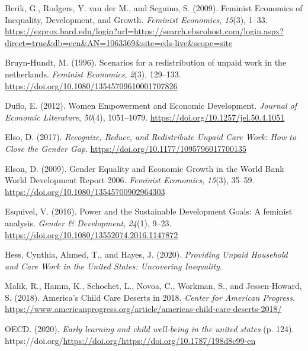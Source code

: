 \documentclass[
  11pt,
]{article}
\newlength{\cslhangindent}
\newenvironment{CSLReferences}[2] %
 {\begin{list}{}{%
  \setlength{\itemindent}{0pt}
  \setlength{\leftmargin}{0pt}
  \setlength{\parsep}{0pt}
  \ifodd #1
   \setlength{\leftmargin}{\cslhangindent}
   \setlength{\itemindent}{-1\cslhangindent}
  \fi
  \setlength{\itemsep}{#2\baselineskip}}}
 {\end{list}}
\begin{document}
\label{refs}
\begin{CSLReferences}{1}{0}
Berik, G., Rodgers, Y. van der M., and Seguino, S. (2009). Feminist
{Economics} of {Inequality}, {Development}, and {Growth}. \emph{Feminist
Economics}, \emph{15}(3), 1--33.
\url{https://ezprox.bard.edu/login?url=https://search.ebscohost.com/login.aspx?direct=true&db=ecn&AN=1063369&site=eds-live&scope=site}

Bruyn-Hundt, M. (1996). Scenarios for a redistribution of unpaid work in
the netherlands. \emph{Feminist Economics}, \emph{2}(3), 129--133.
\url{https://doi.org/10.1080/13545709610001707826}

Duflo, E. (2012). Women {Empowerment} and {Economic} {Development}.
\emph{Journal of Economic Literature}, \emph{50}(4), 1051--1079.
\url{https://doi.org/10.1257/jel.50.4.1051}

Elso, D. (2017). \emph{Recognize, {Reduce}, and {Redistribute} {Unpaid}
{Care} {Work}: {How} to {Close} the {Gender} {Gap}}.
\url{https://doi.org/10.1177/1095796017700135}

Elson, D. (2009). Gender {Equality} and {Economic} {Growth} in the
{World} {Bank} {World} {Development} {Report} 2006. \emph{Feminist
Economics}, \emph{15}(3), 35--59.
\url{https://doi.org/10.1080/13545700902964303}

Esquivel, V. (2016). Power and the {Sustainable} {Development} {Goals}:
A feminist analysis. \emph{Gender \& Development}, \emph{24}(1), 9--23.
\url{https://doi.org/10.1080/13552074.2016.1147872}

Hess, Cynthia, Ahmed, T., and Hayes, J. (2020). \emph{Providing {Unpaid}
{Household} and {Care} {Work} in the {United} {States}: {Uncovering}
{Inequality}}.

Malik, R., Hamm, K., Schochet, L., Novoa, C., Workman, S., and
Jessen-Howard, S. (2018). America's {Child} {Care} {Deserts} in 2018.
\emph{Center for American Progress}.
\url{https://www.americanprogress.org/article/americas-child-care-deserts-2018/}

OECD. (2020). \emph{Early learning and child well-being in the united
states} (p. 124).
https://doi.org/\url{https://doi.org/https://doi.org/10.1787/198d8c99-en}

\end{CSLReferences}
\end{document}
